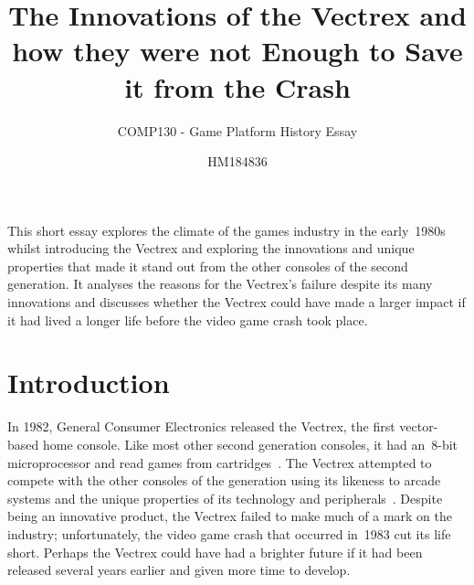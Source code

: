 \documentclass{scrartcl}
\title{The Innovations of the Vectrex and how they were not Enough to Save it from the Crash}
\subtitle{COMP130 - Game Platform History Essay}
\author{HM184836}
\begin{document}
\maketitle


\abstract
{
This short essay explores the climate of the games industry in the early~1980s whilst introducing the Vectrex and exploring the innovations and unique properties that made it stand out from the other consoles of the second generation. It analyses the reasons for the Vectrex's failure despite its many innovations and discusses whether the Vectrex could have made a larger impact if it had lived a longer life before the video game crash took place.
}



\section*{Introduction}

In 1982, General Consumer Electronics released the Vectrex, the first vector-based home console. Like most other second generation consoles, it had an~8-bit microprocessor and read games from cartridges~\cite{vectrex:manual}. The Vectrex attempted to compete with the other consoles of the generation using its likeness to arcade systems and the unique properties of its technology and peripherals~\cite{vectrex:advert}. Despite being an innovative product, the Vectrex failed to make much of a mark on the industry; unfortunately, the video game crash that occurred in~1983 cut its life short. Perhaps the Vectrex could have had a brighter future if it had been released several years earlier and given more time to develop.

\end{document}
